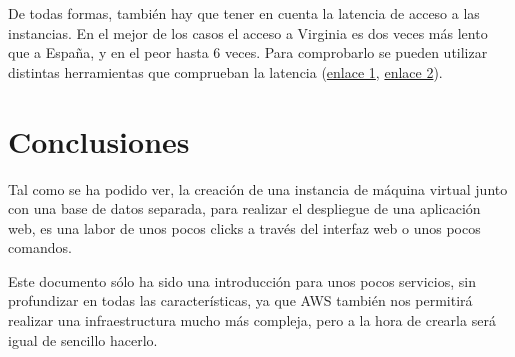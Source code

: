 \documentclass{\ClassPath/viu-tfm-template}
\begin{document}
De todas formas, también hay que tener en cuenta la latencia de acceso a las instancias. En el mejor de los casos el acceso a Virginia es dos veces más lento que a España, y en el peor hasta 6 veces. Para comprobarlo se pueden utilizar distintas herramientas que comprueban la latencia (\href{https://www.cloudping.info/}{enlace 1}, \href{https://www.awsspeedtest.com/latency}{enlace 2}).

\chapter{Conclusiones}

Tal como se ha podido ver, la creación de una instancia de máquina virtual junto con una base de datos separada, para realizar el despliegue de una aplicación web, es una labor de unos pocos clicks a través del interfaz web o unos pocos comandos.

Este documento sólo ha sido una introducción para unos pocos servicios, sin profundizar en todas las características, ya que AWS también nos permitirá realizar una infraestructura mucho más compleja, pero a la hora de crearla será igual de sencillo hacerlo.
\end{document}
